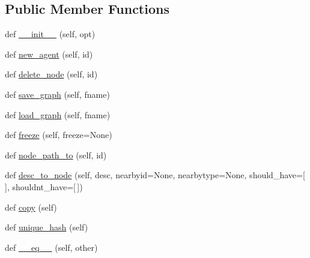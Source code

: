 \subsection*{Public Member Functions}
\begin{DoxyCompactItemize}
\item 
def \hyperlink{classmastering__the__dungeon_1_1tasks_1_1graph__world2_1_1graph_1_1Graph_a439ec854e870a0436a414b8e34affa6c}{\+\_\+\+\_\+init\+\_\+\+\_\+} (self, opt)
\item 
def \hyperlink{classmastering__the__dungeon_1_1tasks_1_1graph__world2_1_1graph_1_1Graph_abfb874a699ae22195f36b3af10ce5ceb}{new\+\_\+agent} (self, id)
\item 
def \hyperlink{classmastering__the__dungeon_1_1tasks_1_1graph__world2_1_1graph_1_1Graph_a23edd3bef3ed5565ef4708f4a7ea1d38}{delete\+\_\+node} (self, id)
\item 
def \hyperlink{classmastering__the__dungeon_1_1tasks_1_1graph__world2_1_1graph_1_1Graph_aa8ab08acb55e401a9e8f0deb501640bc}{save\+\_\+graph} (self, fname)
\item 
def \hyperlink{classmastering__the__dungeon_1_1tasks_1_1graph__world2_1_1graph_1_1Graph_a99a3f4950b15400d0cc3d588302b8f84}{load\+\_\+graph} (self, fname)
\item 
def \hyperlink{classmastering__the__dungeon_1_1tasks_1_1graph__world2_1_1graph_1_1Graph_a240dae7d7d9f8bbaa53750d21e0d17c5}{freeze} (self, freeze=None)
\item 
def \hyperlink{classmastering__the__dungeon_1_1tasks_1_1graph__world2_1_1graph_1_1Graph_a289dcd73f6496ab0f16ed1d76cfe797b}{node\+\_\+path\+\_\+to} (self, id)
\item 
def \hyperlink{classmastering__the__dungeon_1_1tasks_1_1graph__world2_1_1graph_1_1Graph_ad92850262273554e999408b6ba3f2d44}{desc\+\_\+to\+\_\+node} (self, desc, nearbyid=None, nearbytype=None, should\+\_\+have=\mbox{[}$\,$\mbox{]}, shouldnt\+\_\+have=\mbox{[}$\,$\mbox{]})
\item 
def \hyperlink{classmastering__the__dungeon_1_1tasks_1_1graph__world2_1_1graph_1_1Graph_aa88ed1231bee163cd3ccbfd6ec0f7cf7}{copy} (self)
\item 
def \hyperlink{classmastering__the__dungeon_1_1tasks_1_1graph__world2_1_1graph_1_1Graph_a8a04e4cf35e5e0e502c1b529683b82f6}{unique\+\_\+hash} (self)
\item 
def \hyperlink{classmastering__the__dungeon_1_1tasks_1_1graph__world2_1_1graph_1_1Graph_ab2152a1fc6fa0c5240606478953b5622}{\+\_\+\+\_\+eq\+\_\+\+\_\+} (self, other)
\item 

\end{DoxyCompactItemize}
